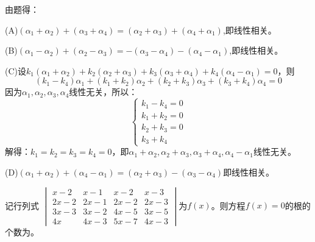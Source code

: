 \documentclass[a4paper]{report}
\begin{document}
\begin{jie}

由题得：

(A)$(\alpha_1+\alpha_2)+ (\alpha_3+\alpha_4)=(\alpha_2+\alpha_3)+(\alpha_4+\alpha_1)$,即线性相关。

(B)$(\alpha_1-\alpha_2)+ (\alpha_2-\alpha_3) =-(\alpha_3-\alpha_4)-(\alpha_4-\alpha_1)$,即线性相关。

(C)设$k_1(\alpha_1+\alpha_2)+k_2(\alpha_2+\alpha_3)+k_3(\alpha_3+\alpha_4)+k_4(\alpha_4-\alpha_1)=0$，则
\begin{equation*}
  (k_1-k_4)\alpha_1+(k_1+k_2)\alpha_2+(k_2+k_3)\alpha_3+(k_3+k_4)\alpha_4=0
\end{equation*}
因为$\alpha_1,\alpha_2,\alpha_3,\alpha_4$线性无关，所以：
\begin{equation*}
\begin{cases}
k_1-k_4=0\\
k_1+k_2=0\\
k_2+k_3=0\\
k_3+k_4
\end{cases}
\end{equation*}
解得：$k_1=k_2=k_3=k_4=0$，即$\alpha_1+\alpha_2,\alpha_2+\alpha_3,\alpha_3+\alpha_4,\alpha_4-\alpha_1$线性无关。

(D)$(\alpha_1+\alpha_2)+(\alpha_4-\alpha_1)=(\alpha_2+\alpha_3)-(\alpha_3-\alpha_4)$即线性相关。
\end{jie}

\EX 记行列式
$
\begin{vmatrix}
x-2&x-1&x-2&x-3\\
2x-2&2x-1&2x-2&2x-3\\
3x-3&3x-2&4x-5&3x-5\\
4x&4x-3&5x-7&4x-3
\end{vmatrix}
$为$f(x)$。则方程$f(x)=0$的根的个数为\underline{\hphantom{~~~~~~~~}}。
\end{document}
